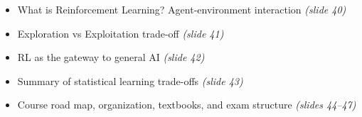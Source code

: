 \begin{itemize}
  \begin{itemize}
    \item What is Reinforcement Learning? Agent-environment interaction \textit{(slide 40)}
    \item Exploration vs Exploitation trade-off \textit{(slide 41)}
    \item RL as the gateway to general AI \textit{(slide 42)}
    \item Summary of statistical learning trade-offs \textit{(slide 43)}
    \item Course road map, organization, textbooks, and exam structure \textit{(slides 44--47)}
  \end{itemize}
\end{itemize}
